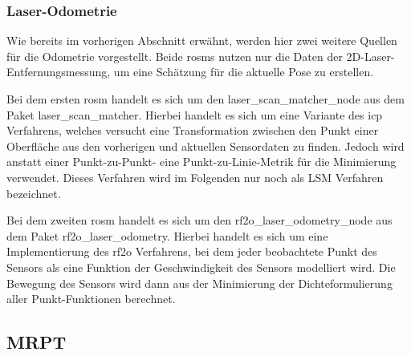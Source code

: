 %
%
\subsubsection{Laser-Odometrie}

Wie bereits im vorherigen Abschnitt erwähnt, werden hier zwei weitere Quellen für die Odometrie vorgestellt. Beide \Glspl{rosm} nutzen nur die Daten der 2D-Laser-Entfernungsmessung, um eine Schätzung für die aktuelle Pose zu erstellen.

Bei dem ersten \gls{rosm} handelt es sich um den laser\_scan\_matcher\_node aus dem Paket laser\_scan\_matcher. Hierbei handelt es sich um eine Variante des \gls{icp} Verfahrens, welches versucht eine Transformation zwischen den Punkt einer Oberfläche aus den vorherigen und aktuellen Sensordaten zu finden. Jedoch wird anstatt einer Punkt-zu-Punkt- eine Punkt-zu-Linie-Metrik für die Minimierung verwendet. \cite{censi2008icp} Dieses Verfahren wird im Folgenden nur noch als LSM Verfahren bezeichnet.

Bei dem zweiten \gls{rosm} handelt es sich um den rf2o\_laser\_odometry\_node aus dem Paket rf2o\_laser\_odometry. Hierbei handelt es sich um eine Implementierung des \gls{rf2o} Verfahrens, bei dem jeder beobachtete Punkt des Sensors als eine Funktion der Geschwindigkeit des Sensors modelliert wird. Die Bewegung des Sensors wird dann aus der Minimierung der Dichteformulierung aller Punkt-Funktionen berechnet. \cite{jaimez2016planar}


%
%
\subsection{MRPT}

